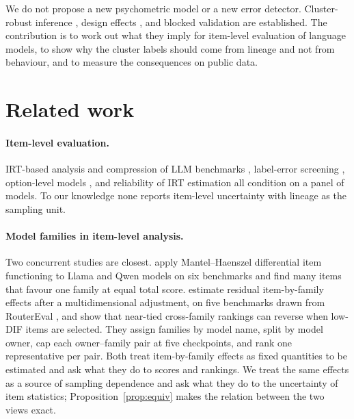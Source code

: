 \documentclass[10pt]{article}
\newif\ifdraft
\newcommand{\todo}[1]{\ifdraft\textcolor{blue!70!black}{[TODO: #1]}\fi}
\theoremstyle{remark}\newtheorem{remark}{Remark}
\begin{document}
We do not propose a new psychometric model or a new error detector.
Cluster-robust inference
\citep{liang1986longitudinal,cameron2015practitioner,mackinnon2023cluster},
design effects \citep{kish1965survey}, and blocked validation
\citep{roberts2017crossvalidation} are established. The contribution is to
work out what they imply for item-level evaluation of language models, to show
why the cluster labels should come from lineage and not from behaviour, and to
measure the consequences on public data.

\section{Related work}\label{sec:related}
\paragraph{Item-level evaluation.}
IRT-based analysis and compression of LLM benchmarks
\citep{lalor2016irt,rodriguez2021informative,polo2024tinybenchmarks,kipnis2025metabench,hofmann2025fluid,zhou2026lost},
label-error screening \citep{northcutt2021labelerrors,gema2024mmlu,truong2025fantastic,land2026auditing},
option-level models \citep{fei2026everywrong}, and reliability of IRT
estimation \citep{jiang2026trustirt} all condition on a panel of models. To
our knowledge none reports item-level uncertainty with lineage as the sampling
unit.

\paragraph{Model families in item-level analysis.}
Two concurrent studies are closest. \citet{dif2026llm} apply Mantel--Haenszel
differential item functioning to Llama and Qwen models on six benchmarks and
find many items that favour one family at equal total score.
\citet{neartied2026rankings} estimate residual item-by-family effects after a
multidimensional adjustment, on five benchmarks drawn from RouterEval
\citep{huang2025routereval}, and show that near-tied cross-family rankings can
reverse when low-DIF items are selected. They assign families by model name,
split by model owner, cap each owner--family pair at five checkpoints, and
rank one representative per pair. Both treat item-by-family effects as fixed
quantities to be estimated and ask what they do to scores and rankings. We
treat the same effects as a source of sampling dependence and ask what they do
to the uncertainty of item statistics; Proposition~\ref{prop:equiv} makes the
relation between the two views exact.
\todo{We read the method of \citet{neartied2026rankings} in full but only the abstract of \citet{dif2026llm}; read the latter in full before submission.}
\end{document}
